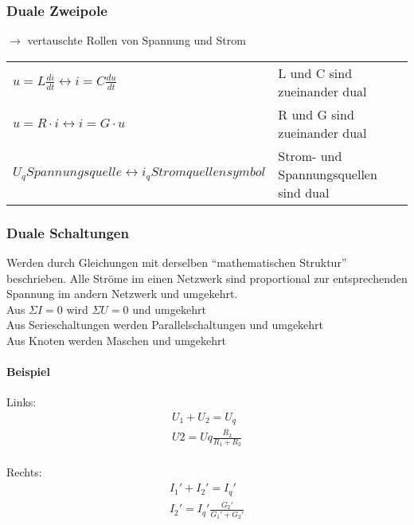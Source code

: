 \subsubsection{Duale Zweipole}
$\rightarrow$ vertauschte Rollen von Spannung und Strom\\
\begin{tabular}{ll}
$u=L\frac{di}{dt} \leftrightarrow i=C\frac{du}{dt}$
& L und C sind zueinander dual\\
$u=R\cdot i \leftrightarrow i=G\cdot u$ &
R und G sind zueinander dual\\
$U_q Spannungsquelle \leftrightarrow i_q Stromquellensymbol$
& Strom- und Spannungsquellen sind dual\\
\end{tabular}
\subsubsection{Duale Schaltungen}
Werden durch Gleichungen mit derselben "`mathematischen Struktur"' beschrieben.
Alle Ströme im einen Netzwerk sind proportional zur entsprechenden Spannung im
andern Netzwerk und umgekehrt.\\
Aus $\Sigma I=0$ wird $\Sigma U=0$ und umgekehrt\\
Aus Serieschaltungen werden Parallelschaltungen und umgekehrt\\
Aus Knoten werden Maschen und umgekehrt\\
\paragraph{Beispiel}
Links:
\begin{align}
U_1+U_2=U_q\nonumber\\
U2=Uq\frac{R_2}{R_1+R_2}\nonumber\\
\end{align}

Rechts:
\begin{align}
I_1'+I_2'=I_q'\nonumber\\
I_2'=I_q'\frac{G_2'}{G_1'+G_2'}\nonumber\\
\end{align}

